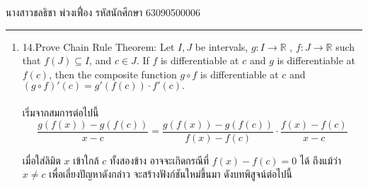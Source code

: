 \documentclass[12pt, a4paper]{article}
\begin{document}
\raggedleft นางสาวชลธิชา พ่วงเฟื่อง  รหัสนักศึกษา 63090500006 \\[12pt]
\hrule\vspace{12pt}
\raggedright

\begin{enumerate}
    \item 14.Prove Chain Rule Theorem: Let $I,J$ be intervals, $g : I\rightarrow \mathbb{R} $ ,  $f : J\rightarrow \mathbb{R} $ such that $f\left ( J \right )\subseteq I$, and $ c\in J.$
    If $f$ is differentiable at $c$ and $g$ is differentiable at $f\left ( c \right )$, then the composite function $g\circ f$
    is differentiable at $c $ and $ {\left (g\circ f  \right )}'\left ( c \right )={g}'\left ( f\left ( c \right ) \right )\cdot {f}'\left ( c \right ).$
    \\ \indent \\
    เริ่มจากสมการต่อไปนี้\\
    \hspace{1cm}$$\frac{g\left (f\left ( x \right )  \right )-g\left ( f\left ( c \right ) \right )}{x-c}=\frac{g\left (f\left ( x \right )  \right )-g\left ( f\left ( c \right ) \right )}{f\left (x  \right )-f\left (c  \right )}\cdot \frac{f\left (x  \right )-f\left (c  \right ) }{x-c}$$

    เมื่อใส่ลิมิต $x$ เข้าใกล้ $c$ ทั้งสองข้าง อาจจะเกิดกรณีที่ $f\left ( x \right )-f\left ( c \right )=0$ ได้ ถึงแม้ว่า $ x\neq c $ เพื่อเลี่ยงปัญหาดังกล่าว
    จะสร้างฟังก์ชันใหม่ขึ้นมา ดังบทพิสูจน์ต่อไปนี้ \\   



\end{enumerate}
\end{document}
